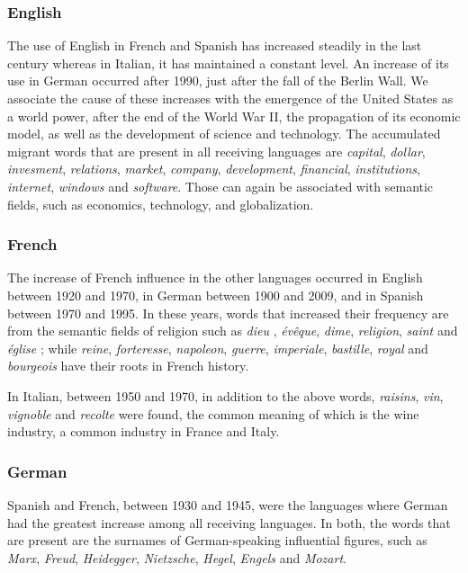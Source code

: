 \documentclass[10pt,letterpaper]{article} %
\begin{document}
\subsubsection*{English} %

The use of English in French and Spanish has increased steadily in the last century
whereas in Italian, it has maintained a constant level. 
An increase of its use in German occurred after 1990, just after the fall of the Berlin Wall. We associate the cause of these increases
with the emergence of the United States as a world power, after the end of the
World War II, the propagation of its economic model, as well as the development
of science and technology. The accumulated migrant words that are present in all receiving
languages are \textit{capital}, \textit{dollar}, \textit{invesment},
\textit{relations}, \textit{market}, \textit{company}, \textit{development},
\textit{financial},  \textit{institutions}, \textit{internet}, \textit{windows}
and \textit{software}. Those can again be associated with semantic fields, such
as economics, technology, and globalization.

\subsubsection*{French} %

The increase of French influence in the other languages occurred in
English between 1920 and 1970, in German between 1900 and 2009, and in Spanish
between 1970 and 1995. In these years, words that increased their frequency
are from the semantic fields of religion such as \textit{dieu} ,
\textit{évêque}, \textit{dime}, \textit{religion}, \textit{saint} and
\textit{église} ; while \textit{reine}, \textit{forteresse},
\textit{napoleon}, \textit{guerre}, \textit{imperiale}, \textit{bastille},
\textit{royal} and \textit{bourgeois} have their roots in French history.

In Italian, between 1950 and 1970, in addition to the above
words, \textit{raisins}, \textit{vin}, \textit{vignoble} and \textit{recolte} were
found, the common meaning of which is the wine industry, a common industry in
France and Italy.

\subsubsection*{German} %

Spanish and French,  between 1930 and 1945, were the languages where German had the greatest
increase among all receiving languages. 
In both, the words that are present are the surnames of German-speaking
influential figures, such as \textit{Marx},
\textit{Freud}, \textit{Heidegger}, \textit{Nietzsche}, \textit{Hegel},
\textit{Engels} and \textit{Mozart}.
\end{document}
